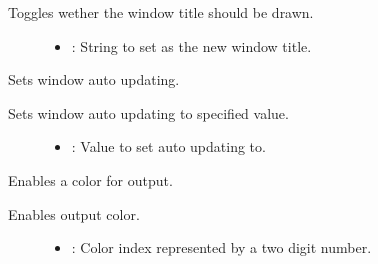 \documentclass[letterpaper,10pt,english]{sphinxmanual}
\begin{document}
\begin{fulllineitems}
\begin{fulllineitems}
Toggles wether the window title should be drawn. \begin{description}
\item[{}] \leavevmode\begin{itemize}
\item {} 
: String to set as the new window title. 

\end{itemize}

\end{description}


\end{fulllineitems}


\begin{fulllineitems}
\label{\detokenize{index:_CPPv2N7ostendo6Window13SetAutoUpdateEb}}%
\pysigstartmultiline
{}\label{\detokenize{index:Pessumclassostendo_1_1Window_1a3d4579a58a6e14b7032390b17fca2313}}%
\pysigstopmultiline
Sets window auto updating. 

Sets window auto updating to specified value. \begin{description}
\item[{}] \leavevmode\begin{itemize}
\item {} 
: Value to set auto updating to. 

\end{itemize}

\end{description}


\end{fulllineitems}


\begin{fulllineitems}
\label{\detokenize{index:_CPPv2N7ostendo6Window7ColorOnEi}}%
\pysigstartmultiline
{}\label{\detokenize{index:Pessumclassostendo_1_1Window_1a4944301b33c64531c83c2bba55c35bc6}}%
\pysigstopmultiline
Enables a color for output. 

Enables output color. \begin{description}
\item[{}] \leavevmode\begin{itemize}
\item {} 
: Color index represented by a two digit number. 


\end{itemize}
\end{description}
\end{fulllineitems}
\end{fulllineitems}
\end{document}
